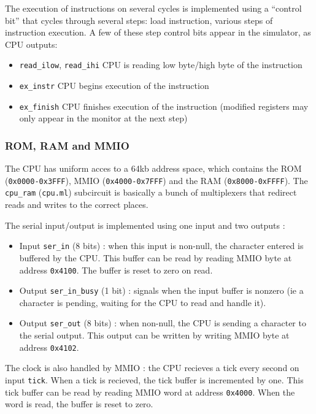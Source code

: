 \documentclass[11pt, a4paper]{article}
\newcommand{\prog}[1]{{\tt#1}}
\begin{document}
The execution of instructions on several cycles is implemented using a ``control bit'' that cycles through
several steps: load instruction, various steps of instruction execution. A few of these step control bits
appear in the simulator, as CPU outputs:

\begin{itemize}
    \item \prog{read\_ilow}, \prog{read\_ihi} CPU is reading low byte/high byte of the instruction
    \item \prog{ex\_instr} CPU begins execution of the instruction
    \item \prog{ex\_finish} CPU finishes execution of the instruction (modified registers may only appear
        in the monitor at the next step)
\end{itemize}


\subsubsection{ROM, RAM and MMIO}

The CPU has uniform acces to a 64kb address space, which contains the ROM (\prog{0x0000-0x3FFF}), MMIO (\prog{0x4000-0x7FFF})
and the RAM (\prog{0x8000-0xFFFF}).
The \prog{cpu\_ram} (\prog{cpu.ml}) subcircuit is basically a bunch of multiplexers that redirect reads and writes to the correct places.

The serial input/output is implemented using one input and two outputs :

\begin{itemize}
    \item Input \prog{ser\_in} (8 bits) : when this input is non-null, the character entered is buffered by
        the CPU. This buffer can be read by reading MMIO byte at address \prog{0x4100}. The buffer is reset to zero
        on read.
    \item Output \prog{ser\_in\_busy} (1 bit) : signals when the input buffer is nonzero (ie a character is
        pending, waiting for the CPU to read and handle it).
    \item Output \prog{ser\_out} (8 bits) : when non-null, the CPU is sending a character to the serial output.
        This output can be written by writing MMIO byte at address \prog{0x4102}.
\end{itemize}

The clock is also handled by MMIO : the CPU recieves a tick every second on input \prog{tick}. When a tick is
recieved, the tick buffer is incremented by one. This tick buffer can be read by reading MMIO word at address
\prog{0x4000}. When the word is read, the buffer is reset to zero.
\end{document}
